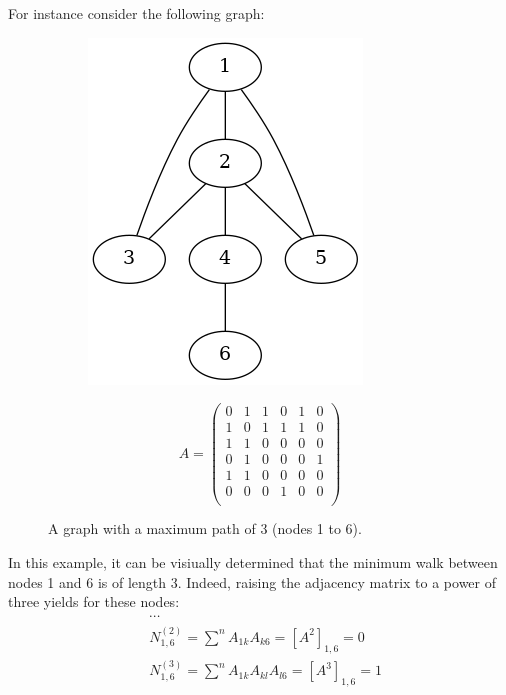   \begin{example}
    For instance consider the following graph:
\begin{figure}[!h]
     \begin{subfigure}[c]{0.4\textwidth}
         \centering
         \includegraphics[scale=0.45]{Figures/chapter1/simple_graph_dist.png}
     \end{subfigure}
     \hfill
     \begin{subfigure}[c]{0.4\textwidth}
       \centering
       \begin{equation*}
         A = 
\begin{pmatrix}
0 & 1 & 1 & 0 & 1 & 0 \\
1 & 0 & 1 & 1 & 1 & 0 \\
1 & 1 & 0 & 0 & 0 & 0 \\
0 & 1 & 0 & 0 & 0 & 1 \\
1 & 1 & 0 & 0 & 0 & 0 \\
0 & 0 & 0 & 1 & 0 & 0 \\
 
\end{pmatrix} \end{equation*}
\label{table:weighted_adj}
\end{subfigure}
  \caption{A graph with a maximum path of 3 (nodes 1 to 6).}
  \label{fig:weighted_graph}
\end{figure}

In this example, it can be visiually determined that the minimum walk
between nodes 1 and 6 is of length 3.  Indeed, raising the adjacency
matrix to a power of three yields for these nodes:
\begin{equation*}
  \begin{split}
 &\cdots \\
 &N_{1,6}^{(2)} = \sum^nA_{1k}A_{k6} = [A^2]_{1,6} = 0 \\
 &N_{1,6}^{(3)} = \sum^nA_{1k}A_{kl}A_{l6} = [A^3]_{1,6} = 1
    \end{split}
\end{equation*}
  \end{example}


